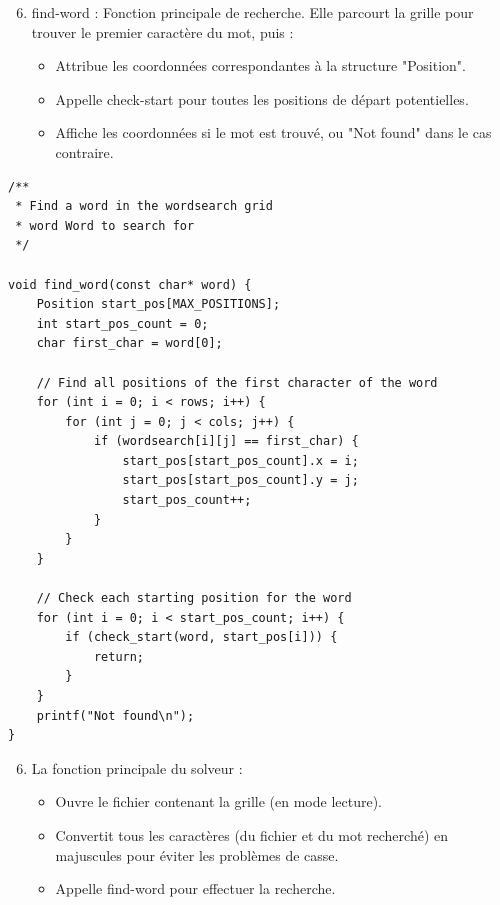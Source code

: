 \begin{enumerate}[resume]
  \setcounter{enumi}{5}
  \item find-word : Fonction principale de recherche. Elle parcourt la grille pour trouver le premier caractère du mot, puis :
    \begin{itemize}
      \item{Attribue les coordonnées correspondantes à la structure "Position".}
      \item{Appelle check-start pour toutes les positions de départ potentielles.}
      \item{Affiche les coordonnées si le mot est trouvé, ou "Not found" dans le cas contraire.}
    \end{itemize}
\end{enumerate}

\begin{lstlisting}[style=CStyle]
/**
 * Find a word in the wordsearch grid
 * word Word to search for
 */
 
void find_word(const char* word) {
	Position start_pos[MAX_POSITIONS];
	int start_pos_count = 0;
	char first_char = word[0];

	// Find all positions of the first character of the word
	for (int i = 0; i < rows; i++) {
		for (int j = 0; j < cols; j++) {
			if (wordsearch[i][j] == first_char) {
				start_pos[start_pos_count].x = i;
				start_pos[start_pos_count].y = j;
				start_pos_count++;
			}
		}
	}

	// Check each starting position for the word
	for (int i = 0; i < start_pos_count; i++) {
		if (check_start(word, start_pos[i])) {
			return;
		}
	}
	printf("Not found\n");
}
\end{lstlisting}

\begin{enumerate}[resume]
  \setcounter{enumi}{5}
  \item La fonction principale du solveur :
    \begin{itemize}
      \item{Ouvre le fichier contenant la grille (en mode lecture).}
      \item{Convertit tous les caractères (du fichier et du mot recherché) en majuscules pour éviter les problèmes de casse.}
      \item{Appelle find-word pour effectuer la recherche.}
    \end{itemize}
\end{enumerate}

